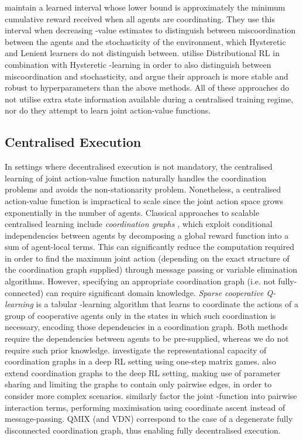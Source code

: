 \documentclass[twoside,11pt]{article}
\renewcommand{\cite}{\citep}
\begin{document}
\citet{palmer_negative_2019} maintain
a learned interval whose lower bound is approximately the minimum cumulative reward received when all agents are coordinating. They use this interval when decreasing -value estimates to distinguish between miscoordination between the agents and the stochasticity of the environment, which Hysteretic and Lenient learners do not distinguish between. 
\citet{lu2019decentralised} utilise Distributional RL \citep{bellemare2017distributional} in combination with Hysteretic -learning in order to also distinguish between miscoordination and stochasticity, and argue their approach is more stable and robust to hyperparameters than the above methods. 
All of these approaches do not utilise extra state information available during a centralised training regime, nor do they attempt to learn joint action-value functions.

\subsection{Centralised Execution}
In settings where decentralised execution is not mandatory, 
the centralised learning of joint action-value function naturally handles the
coordination problems and avoids the non-stationarity problem. Nonetheless, a centralised action-value function is impractical to scale since the joint action space grows exponentially in the number of agents.
Classical approaches to scalable centralised learning include 
\textit{coordination graphs} \cite{guestrin_multiagent_2002}, which exploit conditional independencies between agents by decomposing a global reward function 
into a sum of agent-local terms.
This can significantly reduce the computation required in order to find the maximum joint action (depending on the exact structure of the coordination graph supplied) through message passing or variable elimination algorithms.
However, specifying an appropriate coordination graph (i.e. not fully-connected) can require significant domain knowledge.
\textit{Sparse cooperative Q-learning} \cite{kok_collaborative_2006} is a tabular -learning 
algorithm that learns to coordinate the actions of a group of cooperative 
agents only in the states in which such coordination is necessary, encoding
those dependencies in a coordination graph. 
Both methods require the dependencies between agents to be pre-supplied, whereas we do not require such prior knowledge. 
\citet{castellini2019representational} investigate the representational capacity of coordination graphs in a deep RL setting using one-step matrix games.
\citet{bohmer_deep_2019} also extend coordination graphs to the deep RL setting, making use of parameter sharing and limiting the graphs to contain only pairwise edges, in order to consider more complex scenarios. 
\citet{chen_factorized_2018} similarly factor the joint -function into pairwise interaction terms, performing maximisation using coordinate ascent instead of message-passing.
QMIX (and VDN) correspond to the case of a degenerate fully disconnected coordination graph,  thus enabling fully decentralised execution.
\end{document}
